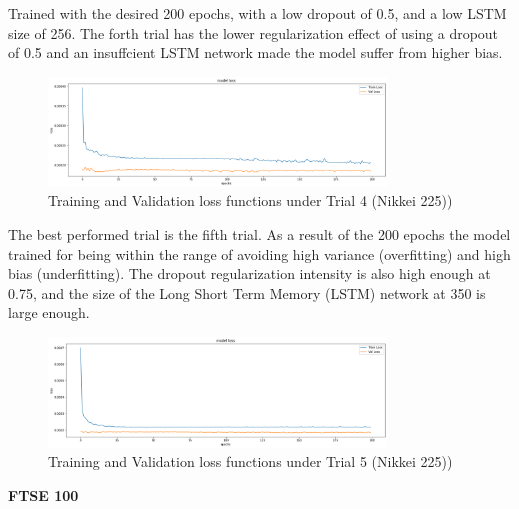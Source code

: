 \documentclass[a4paper,11pt,oneside]{book}
\begin{document}
Trained with the desired 200 epochs, with a low dropout of 0.5, and a low LSTM size of 256. The forth trial
has the lower regularization effect of using a dropout of 0.5 and an insuffcient LSTM
network made the model suffer from higher bias.\newline\newline\newline
\begin{figure}[!h]
	\centering
	\includegraphics[width=0.8\textwidth]{figures/Nik4}
	\caption{Training and Validation loss functions under Trial 4 (Nikkei 225))}
	\label{Nik4}
\end{figure}

The best performed trial is the fifth trial. As a result of the 200 epochs the model trained for being within the range
of avoiding high variance (overfitting) and high bias (underfitting). The dropout regularization intensity is also high enough at 0.75,
and the size of the Long Short Term Memory (LSTM) network at 350 is large enough.\newline
\begin{figure}[!h]
	\centering
	\includegraphics[width=0.8\textwidth]{figures/Nik5}
	\caption{Training and Validation loss functions under Trial 5 (Nikkei 225))}
	\label{Nik5}
\end{figure}
\newline\textbf{FTSE 100}\newline
\end{document}
